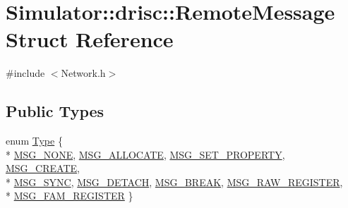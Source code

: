 \hypertarget{struct_simulator_1_1drisc_1_1_remote_message}{\section{Simulator\+:\+:drisc\+:\+:Remote\+Message Struct Reference}
\label{struct_simulator_1_1drisc_1_1_remote_message}
}


{\ttfamily \#include $<$Network.\+h$>$}

\subsection*{Public Types}
\begin{DoxyCompactItemize}
\item 
enum \hyperlink{struct_simulator_1_1drisc_1_1_remote_message_aa6920cd59d9069d038eeb3ddfa9fd7cd}{Type} \{ \\*
\hyperlink{struct_simulator_1_1drisc_1_1_remote_message_aa6920cd59d9069d038eeb3ddfa9fd7cda1db1fc6165c801b6943b73a71a02a018}{M\+S\+G\+\_\+\+N\+O\+N\+E}, 
\hyperlink{struct_simulator_1_1drisc_1_1_remote_message_aa6920cd59d9069d038eeb3ddfa9fd7cdadb9937d16ae721c6b3b9a6074b388ac8}{M\+S\+G\+\_\+\+A\+L\+L\+O\+C\+A\+T\+E}, 
\hyperlink{struct_simulator_1_1drisc_1_1_remote_message_aa6920cd59d9069d038eeb3ddfa9fd7cda876bdb668cc5423180bde2918897a3ce}{M\+S\+G\+\_\+\+S\+E\+T\+\_\+\+P\+R\+O\+P\+E\+R\+T\+Y}, 
\hyperlink{struct_simulator_1_1drisc_1_1_remote_message_aa6920cd59d9069d038eeb3ddfa9fd7cda1e1c578107a0d1e89a5947e8ce6048a4}{M\+S\+G\+\_\+\+C\+R\+E\+A\+T\+E}, 
\\*
\hyperlink{struct_simulator_1_1drisc_1_1_remote_message_aa6920cd59d9069d038eeb3ddfa9fd7cda56d7cdbfbe0fead3f90d774f29a2d2d1}{M\+S\+G\+\_\+\+S\+Y\+N\+C}, 
\hyperlink{struct_simulator_1_1drisc_1_1_remote_message_aa6920cd59d9069d038eeb3ddfa9fd7cda50c4d17a1c399b056d597ee2a17b99ac}{M\+S\+G\+\_\+\+D\+E\+T\+A\+C\+H}, 
\hyperlink{struct_simulator_1_1drisc_1_1_remote_message_aa6920cd59d9069d038eeb3ddfa9fd7cdaf1faf89903a9ebaab393ba0ad42860f1}{M\+S\+G\+\_\+\+B\+R\+E\+A\+K}, 
\hyperlink{struct_simulator_1_1drisc_1_1_remote_message_aa6920cd59d9069d038eeb3ddfa9fd7cdabc5b1579f5d83678c28eaf876cbe5eec}{M\+S\+G\+\_\+\+R\+A\+W\+\_\+\+R\+E\+G\+I\+S\+T\+E\+R}, 
\\*
\hyperlink{struct_simulator_1_1drisc_1_1_remote_message_aa6920cd59d9069d038eeb3ddfa9fd7cdab4ca6f401e08885024d7e923521cd320}{M\+S\+G\+\_\+\+F\+A\+M\+\_\+\+R\+E\+G\+I\+S\+T\+E\+R}
 \}
\end{DoxyCompactItemize}
